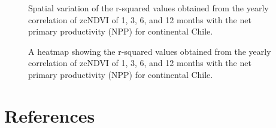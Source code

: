 \documentclass[
  authoryear,
  preprint,
  3p,
  onecolumn]{elsarticle}
\begin{document}
\begin{figure}[!ht]


\caption{\label{fig-r2_npp_zcNDVI}Spatial variation of the r-squared
values obtained from the yearly correlation of zcNDVI of 1, 3, 6, and 12
months with the net primary productivity (NPP) for continental Chile.}

\end{figure}%

\begin{figure}[!ht]


\caption{\label{fig-hetmap_npp_zcndvi}A heatmap showing the r-squared
values obtained from the yearly correlation of zcNDVI of 1, 3, 6, and 12
months with the net primary productivity (NPP) for continental Chile.}

\end{figure}%

\newpage

\section*{References}\label{references}

\renewcommand{\bibsection}{}

\end{document}
